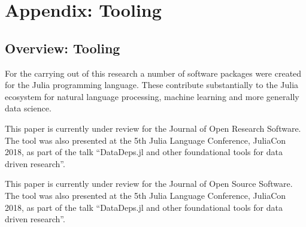 \documentclass{book}
\begin{document}
	\part{Appendix: Tooling}
	
	\chapter{Overview: Tooling}
	For the carrying out of this research a number of software packages were created for the Julia programming language.
	These contribute substantially to the Julia ecosystem for natural language processing, machine learning and more generally data science.
	
	
%	
	
	
	\begin{preamble}
		This paper is currently under review for the Journal of Open Research Software.
		The tool was also presented at the 5th Julia Language Conference, JuliaCon 2018,
		as part of the talk ``DataDeps.jl and other foundational tools for data driven research''.
	\end{preamble}
	
		
	\begin{preamble}
		This paper is currently under review for the Journal of Open Source Software.
		The tool was also presented at the 5th Julia Language Conference, JuliaCon 2018,
		as part of the talk ``DataDeps.jl and other foundational tools for data driven research''.
	\end{preamble}
	
\end{document}
